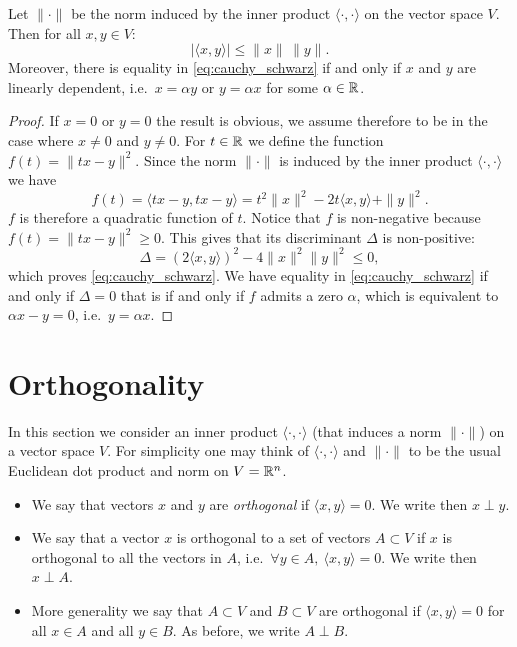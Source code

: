 \documentclass[11pt,nocut]{article}
\begin{document}
\begin{theorem}
	Let $\| \cdot \|$ be the norm induced by the inner product $\langle \cdot , \cdot \rangle$ on the vector space $V$. Then for all $x,y \in V$:
	\begin{equation}\label{eq:cauchy_schwarz}
	| \langle x,y \rangle | \leq \|x\| \, \|y\|.
	\end{equation}
	Moreover, there is equality in \eqref{eq:cauchy_schwarz} if and only if $x$ and $y$ are linearly dependent, i.e.\ $x = \alpha y$ or $y = \alpha x$ for some $\alpha \in \mathbb{R}$.
\end{theorem}
\begin{proof}
	If $x = 0$ or $y = 0$ the result is obvious, we assume therefore to be in the case where $x \neq 0$ and $y \neq 0$.
	For $t \in \mathbb{R}$ we define the function $f(t) = \|t x - y \|^2$. Since the norm $\| \cdot \|$ is induced by the inner product $\langle \cdot, \cdot \rangle$ we have
	$$
	f(t) = \langle t x - y , t x - y \rangle = t^2 \|x\|^2 - 2t \langle x,y\rangle + \|y\|^2.
	$$
	$f$ is therefore a quadratic function of $t$. Notice that $f$ is non-negative because $f(t)= \|t x - y \|^2 \geq 0$. This gives that its discriminant $\Delta$ is non-positive:
	$$
	\Delta =  (2 \langle x,y \rangle)^2 - 4 \|x\|^2 \|y\|^2 \leq 0,
	$$
	which proves \eqref{eq:cauchy_schwarz}. We have equality in \eqref{eq:cauchy_schwarz} if and only if $\Delta = 0$ that is if and only if $f$ admits a zero $\alpha$, which is equivalent to $\alpha x - y = 0$, i.e.\ $y = \alpha x$.
\end{proof}

\section{Orthogonality}

In this section we consider an inner product $\langle \cdot, \cdot \rangle$ (that induces a norm $\| \cdot \|$) on a vector space $V$. For simplicity one may think of $\langle \cdot, \cdot \rangle$ and $\| \cdot \|$ to be the usual Euclidean dot product and norm on $V = \mathbb{R}^n$.

\begin{definition}[Orthogonality]
	\begin{itemize}
		\item We say that vectors $x$ and $y$ are \emph{orthogonal} if $\langle x,y \rangle = 0$. We write then $x \perp y$.
		\item We say that a vector $x$ is orthogonal to a set of vectors $A \subset V$ if $x$ is orthogonal to all the vectors in $A$, i.e.\ $\forall y \in A, \ \langle x,y\rangle = 0$. We write then $x \perp A$.
		\item More generality we say that $A \subset V$ and $B \subset V$ are orthogonal if $\langle x,y \rangle = 0$ for all $x \in A$ and all $y \in B$. As before, we write $A \perp B$.
	\end{itemize}
\end{definition}
\end{document}
